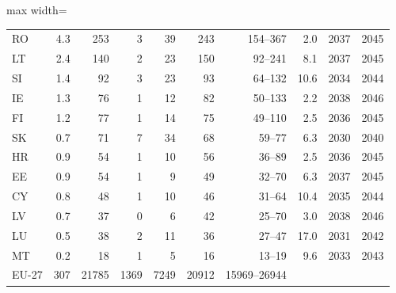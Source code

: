 \begin{table}[pos=t]
\begin{adjustbox}{max width=\linewidth}
\begin{tabular}{@{}lrrrrrrrcc@{}}
RO & 4.3 & 253 & 3 & 39 & 243 & 154--367 & 2.0 & 2037 & 2045 \\
LT & 2.4 & 140 & 2 & 23 & 150 & 92--241 & 8.1 & 2037 & 2045 \\
SI & 1.4 & 92 & 3 & 23 & 93 & 64--132 & 10.6 & 2034 & 2044 \\
IE & 1.3 & 76 & 1 & 12 & 82 & 50--133 & 2.2 & 2038 & 2046 \\
FI & 1.2 & 77 & 1 & 14 & 75 & 49--110 & 2.5 & 2036 & 2045 \\
SK & 0.7 & 71 & 7 & 34 & 68 & 59--77 & 6.3 & 2030 & 2040 \\
HR & 0.9 & 54 & 1 & 10 & 56 & 36--89 & 2.5 & 2036 & 2045 \\
EE & 0.9 & 54 & 1 & 9 & 49 & 32--70 & 6.3 & 2037 & 2045 \\
CY & 0.8 & 48 & 1 & 10 & 46 & 31--64 & 10.4 & 2035 & 2044 \\
LV & 0.7 & 37 & 0 & 6 & 42 & 25--70 & 3.0 & 2038 & 2046 \\
LU & 0.5 & 38 & 2 & 11 & 36 & 27--47 & 17.0 & 2031 & 2042 \\
MT & 0.2 & 18 & 1 & 5 & 16 & 13--19 & 9.6 & 2033 & 2043 \\
\midrule EU-27 & 307 & 21785 & 1369 & 7249 & 20912 & 15969--26944 & & & \\
\bottomrule\end{tabular}\end{adjustbox}\end{table}
